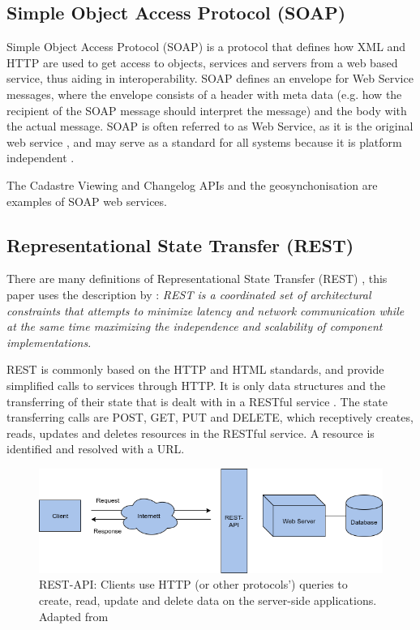 \subsection{Simple Object Access Protocol (SOAP)}
Simple Object Access Protocol (SOAP) is a protocol that defines how XML and HTTP are used to get access to objects, services and servers from a web based service, thus aiding in interoperability. SOAP defines an envelope for Web Service messages, where the envelope consists of a header with meta data (e.g. how the recipient of the SOAP message should interpret the message) and the body with the actual message. SOAP is often referred to as Web Service, as it is the original web service \citep{Kartverket2013}, and may serve as a standard for all systems because it is platform independent \citep{Sipes2004}. 

The Cadastre Viewing and Changelog APIs and the geosynchonisation are examples of SOAP web services. 


\subsection{Representational State Transfer (REST)}
There are many definitions of Representational State Transfer (REST) \citep{Fielding, Richardson}, this paper uses the description by \cite{Fieldinga}: \textit{REST is a coordinated set of architectural constraints that attempts to minimize latency and network communication while at the same time maximizing the independence and scalability of component implementations}. 

REST is commonly based on the HTTP and HTML standards, and provide simplified calls to services through HTTP. It is only data structures and the transferring of their state that is dealt with in a RESTful service \citep{Battle2008}. The state transferring calls are POST, GET, PUT and DELETE, which receptively creates, reads, updates and deletes resources in the RESTful service. A resource is identified and resolved with a URL.

\begin{figure}[H]
	\centering
	\includegraphics[scale=0.5]{img/REST}
	\caption{REST-API: Clients use  HTTP (or other protocols') queries to create, read, update and delete data on the server-side applications.  Adapted from \citep{Ceeb2013} }
	\label{fig:rest}
\end{figure}

